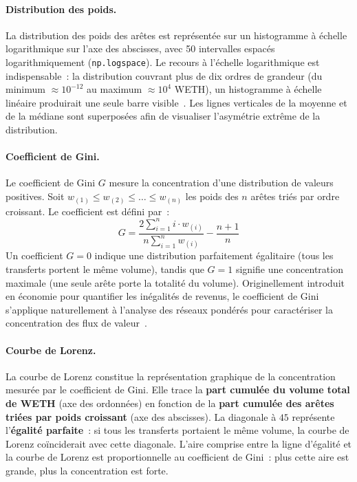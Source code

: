\paragraph{Distribution des poids.}
La distribution des poids des ar\^etes est repr\'esent\'ee sur un histogramme \`a \'echelle logarithmique sur l'axe des abscisses, avec 50 intervalles espac\'es logarithmiquement (\texttt{np.logspace}). Le recours \`a l'\'echelle logarithmique est indispensable~: la distribution couvrant plus de dix ordres de grandeur (du minimum $\approx 10^{-12}$ au maximum $\approx 10^{4}$ WETH), un histogramme \`a \'echelle lin\'eaire produirait une seule barre visible~\cite{clauset2009powerlaw}. Les lignes verticales de la moyenne et de la m\'ediane sont superpos\'ees afin de visualiser l'asym\'etrie extr\^eme de la distribution.

\paragraph{Coefficient de Gini.}
Le coefficient de Gini $G$ mesure la concentration d'une distribution de valeurs positives. Soit $w_{(1)} \leq w_{(2)} \leq \ldots \leq w_{(n)}$ les poids des $n$ ar\^etes tri\'es par ordre croissant. Le coefficient est d\'efini par~:
\begin{equation}
G = \frac{2 \displaystyle\sum_{i=1}^{n} i \cdot w_{(i)}}{n \displaystyle\sum_{i=1}^{n} w_{(i)}} - \frac{n+1}{n}
\label{eq:gini}
\end{equation}
Un coefficient $G = 0$ indique une distribution parfaitement \'egalitaire (tous les transferts portent le m\^eme volume), tandis que $G = 1$ signifie une concentration maximale (une seule ar\^ete porte la totalit\'e du volume). Originellement introduit en \'economie pour quantifier les in\'egalit\'es de revenus, le coefficient de Gini s'applique naturellement \`a l'analyse des r\'eseaux pond\'er\'es pour caract\'eriser la concentration des flux de valeur~\cite{newman2018networks}.

\paragraph{Courbe de Lorenz.}
La courbe de Lorenz constitue la repr\'esentation graphique de la concentration mesur\'ee par le coefficient de Gini. Elle trace la \textbf{part cumul\'ee du volume total de WETH} (axe des ordonn\'ees) en fonction de la \textbf{part cumul\'ee des ar\^etes tri\'ees par poids croissant} (axe des abscisses). La diagonale \`a $45$\textdegree{} repr\'esente l'\textbf{\'egalit\'e parfaite}~: si tous les transferts portaient le m\^eme volume, la courbe de Lorenz co\"inciderait avec cette diagonale. L'aire comprise entre la ligne d'\'egalit\'e et la courbe de Lorenz est proportionnelle au coefficient de Gini~: plus cette aire est grande, plus la concentration est forte.

